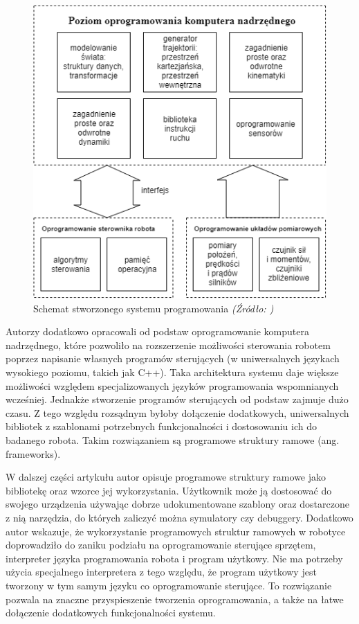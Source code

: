 \documentclass[a4paper, 12pt, twoside]{article}
\begin{document}
\begin{figure}[hbt!]
\centering
\includegraphics[width=0.8\linewidth]{images/system_scheme.png}
\caption{Schemat stworzonego systemu programowania\textit{ (Źródło: \cite{systemkozlowski}) } }
\label{fig:system_scheme}
\end{figure}

Autorzy dodatkowo opracowali od podstaw oprogramowanie komputera nadrzędnego, które pozwoliło na rozszerzenie możliwości sterowania robotem poprzez napisanie własnych programów sterujących (w uniwersalnych językach wysokiego poziomu, takich jak C++). Taka architektura systemu daje większe możliwości względem specjalizowanych języków programowania wspomnianych wcześniej. Jednakże stworzenie programów sterujących od podstaw zajmuje dużo czasu. Z tego względu rozsądnym byłoby dołączenie dodatkowych, uniwersalnych bibliotek z szablonami potrzebnych funkcjonalności i dostosowaniu ich do badanego robota. Takim rozwiązaniem są programowe struktury ramowe (ang. frameworks).

W dalszej części artykułu \cite{ramowezielinski} autor opisuje programowe struktury ramowe jako bibliotekę oraz wzorce jej wykorzystania. Użytkownik może ją dostosować do swojego urządzenia używając dobrze udokumentowane szablony oraz dostarczone z nią narzędzia, do których zaliczyć można symulatory czy debuggery. Dodatkowo autor wskazuje, że wykorzystanie programowych struktur ramowych w robotyce doprowadziło do zaniku podziału na oprogramowanie sterujące sprzętem, interpreter języka programowania robota i program użytkowy. Nie ma potrzeby użycia specjalnego interpretera z tego względu, że program użytkowy jest tworzony w tym samym języku co oprogramowanie sterujące. To rozwiązanie pozwala na znaczne przyspieszenie tworzenia oprogramowania, a także na łatwe dołączenie dodatkowych funkcjonalności systemu.
\end{document}
